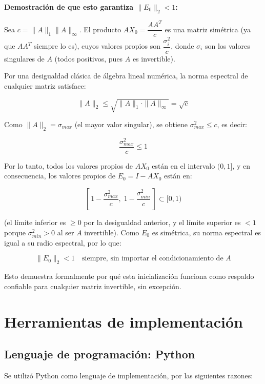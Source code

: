 \documentclass[12pt,a4paper]{article}
\begin{document}
\textbf{Demostración de que esto garantiza $\|E_0\|_2 < 1$:}

Sea $c = \|A\|_1\|A\|_\infty$. El producto $AX_0 = \dfrac{AA^T}{c}$ es una matriz simétrica (ya que $AA^T$ siempre lo es), cuyos valores propios son $\dfrac{\sigma_i^2}{c}$, donde $\sigma_i$ son los valores singulares de $A$ (todos positivos, pues $A$ es invertible).

Por una desigualdad clásica de álgebra lineal numérica, la norma espectral de cualquier matriz satisface:

\[
    \|A\|_2 \leq \sqrt{\|A\|_1 \cdot \|A\|_\infty} = \sqrt{c}
\]

Como $\|A\|_2 = \sigma_{max}$ (el mayor valor singular), se obtiene $\sigma_{max}^2 \leq c$, es decir:

\[
    \frac{\sigma_{max}^2}{c} \leq 1
\]

Por lo tanto, todos los valores propios de $AX_0$ están en el intervalo $(0, 1]$, y en consecuencia, los valores propios de $E_0 = I - AX_0$ están en:

\[
    \left[\,1 - \frac{\sigma_{max}^2}{c},\; 1 - \frac{\sigma_{min}^2}{c}\,\right] \subset [0, 1)
\]

(el límite inferior es $\geq 0$ por la desigualdad anterior, y el límite superior es $<1$ porque $\sigma_{min}^2 > 0$ al ser $A$ invertible). Como $E_0$ es simétrica, su norma espectral es igual a su radio espectral, por lo que:

\[
    \|E_0\|_2 < 1 \quad \text{siempre, sin importar el condicionamiento de } A
\]

Esto demuestra formalmente por qué esta inicialización funciona como respaldo confiable para cualquier matriz invertible, sin excepción.

\section{Herramientas de implementación}

\subsection{Lenguaje de programación: Python}

Se utilizó Python como lenguaje de implementación, por las siguientes razones:
\end{document}
